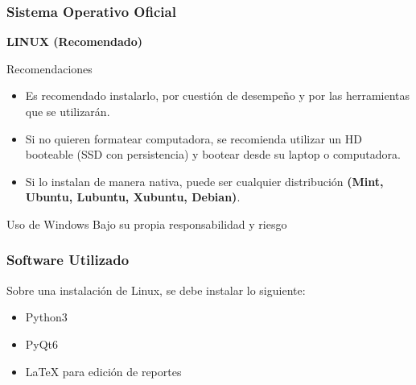 \begin{frame}
\frametitle{Sistema Operativo Oficial}

\textbf{LINUX (Recomendado)}
\begin{block}{Recomendaciones}
\begin{itemize}
\item Es recomendado instalarlo, por cuestión de desempeño y por las herramientas que se utilizarán.
\item Si no quieren formatear computadora, se recomienda utilizar un HD booteable (SSD con persistencia) y bootear desde su laptop o computadora.
\item Si lo instalan de manera nativa, puede ser cualquier distribución \textbf{(Mint, Ubuntu, Lubuntu, Xubuntu, Debian)}.
\end{itemize}
\end{block}
\begin{block}{Uso de Windows}
Bajo su propia responsabilidad y riesgo
\end{block}
\end{frame}


\begin{frame}
\frametitle{Software Utilizado}
Sobre una instalación de Linux, se debe instalar lo siguiente:
\begin{itemize}
\item Python3
\item PyQt6
\item LaTeX para edición de reportes
\end{itemize}
\end{frame}

